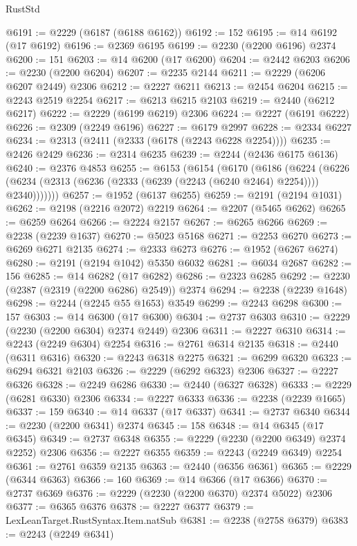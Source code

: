 \begin{lexlean}{RustStd}
\begin{coremodule}
{\begin{coremodule}
{{{{{{{{{{{{{{{{{{{{{{{{{{{{{{{{{{@6191 := @2229 (@6187 (@6188 @6162))
@6192 := 152
@6195 := @14 @6192 (@17 @6192)
@6196 := @2369 @6195
@6199 := @2230 (@2200 @6196) @2374
@6200 := 151
@6203 := @14 @6200 (@17 @6200)
@6204 := @2442 @6203
@6206 := @2230 (@2200 @6204)
@6207 := @2235 @2144
@6211 := @2229 (@6206 @6207 @2449) @2306
@6212 := @2227 @6211
@6213 := @2454 @6204
@6215 := @2243 @2519 @2254
@6217 := @6213 @6215 @2103
@6219 := @2440 (@6212 @6217)
@6222 := @2229 (@6199 @6219) @2306
@6224 := @2227 (@6191 @6222)
@6226 := @2309 (@2249 @6196)
@6227 := @6179 @2997
@6228 := @2334 @6227
@6234 := @2313 (@2411 (@2333 (@6178 (@2243 @6228 @2254))))
@6235 := @2426 @2429
@6236 := @2314 @6235
@6239 := @2244 (@2436 @6175 @6136)
@6240 := @2376 @4853
@6255 := @6153
    (@6154
      (@6170
        (@6186
          (@6224
            (@6226 (@6234 (@2313 (@6236 (@2333 (@6239 (@2243 (@6240 @2464) @2254)))) @2340)))))))
@6257 := @1952 (@6137 @6255)
@6259 := @2191 (@2194 @1031)
@6262 := @2198 (@2216 @2072) @2219
@6264 := @2207 (@5465 @6262)
@6265 := @6259 @6264
@6266 := @2224 @2157
@6267 := @6265 @6266
@6269 := @2238 (@2239 @1637)
@6270 := @5023 @5168
@6271 := @2253 @6270
@6273 := @6269 @6271 @2135
@6274 := @2333 @6273
@6276 := @1952 (@6267 @6274)
@6280 := @2191 (@2194 @1042) @5350 @6032
@6281 := @6034 @2687
@6282 := 156
@6285 := @14 @6282 (@17 @6282)
@6286 := @2323 @6285
@6292 := @2230 (@2387 (@2319 (@2200 @6286) @2549)) @2374
@6294 := @2238 (@2239 @1648)
@6298 := @2244 (@2245 @55 @1653) @3549
@6299 := @2243 @6298
@6300 := 157
@6303 := @14 @6300 (@17 @6300)
@6304 := @2737 @6303
@6310 := @2229 (@2230 (@2200 @6304) @2374 @2449) @2306
@6311 := @2227 @6310
@6314 := @2243 (@2249 @6304) @2254
@6316 := @2761 @6314 @2135
@6318 := @2440 (@6311 @6316)
@6320 := @2243 @6318 @2275
@6321 := @6299 @6320
@6323 := @6294 @6321 @2103
@6326 := @2229 (@6292 @6323) @2306
@6327 := @2227 @6326
@6328 := @2249 @6286
@6330 := @2440 (@6327 @6328)
@6333 := @2229 (@6281 @6330) @2306
@6334 := @2227 @6333
@6336 := @2238 (@2239 @1665)
@6337 := 159
@6340 := @14 @6337 (@17 @6337)
@6341 := @2737 @6340
@6344 := @2230 (@2200 @6341) @2374
@6345 := 158
@6348 := @14 @6345 (@17 @6345)
@6349 := @2737 @6348
@6355 := @2229 (@2230 (@2200 @6349) @2374 @2252) @2306
@6356 := @2227 @6355
@6359 := @2243 (@2249 @6349) @2254
@6361 := @2761 @6359 @2135
@6363 := @2440 (@6356 @6361)
@6365 := @2229 (@6344 @6363)
@6366 := 160
@6369 := @14 @6366 (@17 @6366)
@6370 := @2737 @6369
@6376 := @2229 (@2230 (@2200 @6370) @2374 @5022) @2306
@6377 := @6365 @6376
@6378 := @2227 @6377
@6379 := LexLeanTarget.RustSyntax.Item.natSub
@6381 := @2238 (@2758 @6379)
@6383 := @2243 (@2249 @6341)
}}}}}}}}}}}}}}}}}}}}}}}}}}}}}}}}}}
\end{coremodule}}
\end{coremodule}
\end{lexlean}
